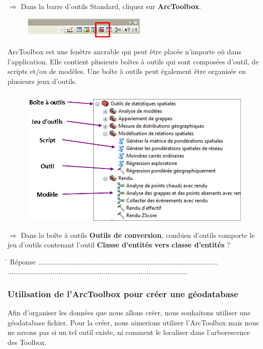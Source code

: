 \documentclass[11pt]{article}
\newcommand{\action}{$\Rightarrow$ }
\newcommand{\reponse}{
	\begin{tabbing}
	\hspace{2cm}\=\kill
	Réponse \> ............................................................................................ \\
 	\> ............................................................................................
	\end{tabbing}
}
\begin{document}
\action Dans la barre d'outils Standard, cliquez sur \textbf{ArcToolbox}.
\begin{figure}[H]
	\center \includegraphics{img/td3/arctoolbox_bouton.png}\\
\end{figure}

ArcToolbox est une fenêtre ancrable qui peut être placée n'importe où dans l'application. Elle contient plusieurs boîtes à outils qui sont composées d'outil, de scripts et/ou de modèles. Une boîte à outils peut également être organisée en plusieurs jeux d'outils.
\begin{figure}[H]
	\center \includegraphics{img/td3/arctoolbox_composition.png}\\
\end{figure}

\action Dans la boîte à outils \textbf{Outils de conversion}, combien d'outils comporte le jeu d'outils contenant l'outil \textbf{Classe d'entités vers classe d'entités} ?

\reponse


\subsubsection{Utilisation de l'ArcToolbox pour créer une géodatabase}
Afin d'organiser les données que nous allons créer, nous souhaitons utiliser une géodatabase fichier. Pour la créer, nous aimerions utiliser l'ArcToolbox mais nous ne savons pas si un tel outil existe, ni comment le localiser dans l'arborescence des Toolbox.
\end{document}

